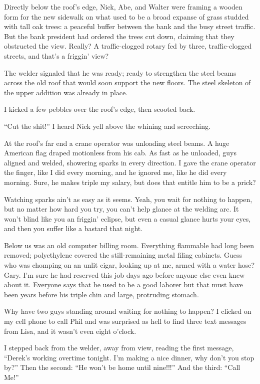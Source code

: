 Directly below the roof's edge, Nick, Abe, and Walter were framing a
wooden form for the new sidewalk on what used to be a broad expanse of
grass studded with tall oak trees: a peaceful buffer between the bank
and the busy street traffic. But the bank president had ordered the
trees cut down, claiming that they obstructed the view. Really? A
traffic-clogged rotary fed by three, traffic-clogged streets, and that's
a friggin' view?

The welder signaled that he was ready; ready to strengthen the steel
beams across the old roof that would soon support the new floors. The
steel skeleton of the upper addition was already in place.

I kicked a few pebbles over the roof's edge, then scooted back. ~~~

``Cut the shit!'' I heard Nick yell above the whining and screeching.
~~~

At the roof's far end a crane operator was unloading steel beams. A huge
American flag draped motionless from his cab. As fast as he unloaded,
guys aligned and welded, showering sparks in every direction. I gave the
crane operator the finger, like I did every morning, and he ignored me,
like he did every morning. Sure, he makes triple my salary, but does
that entitle him to be a prick?

Watching sparks ain't as easy as it seems. Yeah, you wait for nothing to
happen, but no matter how hard you try, you can't help glance at the
welding arc. It won't blind like you an friggin' eclipse, but even a
casual glance hurts your eyes, and then you suffer like a bastard that
night. ~

Below us was an old computer billing room. Everything flammable had long
been removed; polyethylene covered the still-remaining metal filing
cabinets. Guess who was chomping on an unlit cigar, looking up at me,
armed with a water hose? Gary. I'm sure he had reserved this job days
ago before anyone else even knew about it. Everyone says that he used to
be a good laborer but that must have been years before his triple chin
and large, protruding stomach. ~

Why have two guys standing around waiting for nothing to happen? I
clicked on my cell phone to call Phil and was surprised as hell to find
three text messages from Lisa, and it wasn't even eight o'clock.

I stepped back from the welder, away from view, reading the first
message, ``Derek's working overtime tonight. I'm making a nice dinner,
why don't you stop by?'' Then the second: ``He won't be home until
nine!!!'' And the third: ``Call Me!'' ~

